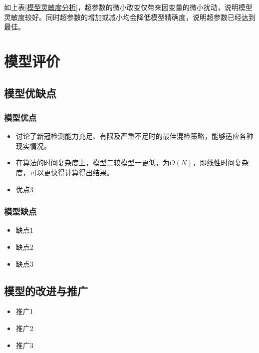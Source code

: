 \documentclass[withoutpreface,bwprint]{cumcmthesis} %
\begin{document}
如上表\ref{模型灵敏度分析}，超参数的微小改变仅带来因变量的微小扰动，说明模型灵敏度较好。同时超参数的增加或减小均会降低模型精确度，说明超参数已经达到最佳。


\section{模型评价}
\subsection{模型优缺点}
\subsubsection{模型优点}
\begin{itemize}
    \item 讨论了新冠检测能力充足、有限及严重不足时的最佳混检策略，能够适应各种现实情况。
    
    \item 在算法的时间复杂度上，模型二较模型一更低，为$O(N)$，即线性时间复杂度，可以更快得计算得出结果。
    
    \item 优点3
\end{itemize}

\subsubsection{模型缺点}
\begin{itemize}
    \item 缺点1
    
    \item 缺点2
    
    \item 缺点3
\end{itemize}


\subsection{模型的改进与推广}
\begin{itemize}
    \item 推广1
    
    \item 推广2
    
    \item 推广3
\end{itemize}


\newpage
\end{document}
